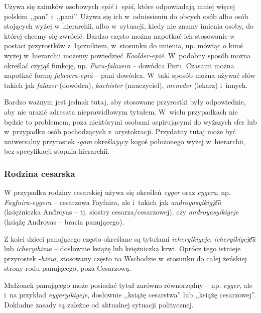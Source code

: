 \begin{spacing}{1.1}
\skipline

Używa się zaimków osobowych \emph{epié} i~\emph{epiá}, które odpowiadają mniej
więcej polskim ,,pan'' i~,,pani''. Używa się ich w~odniesieniu do obcych osób albo
osób stojących wyżej w~hierarchii, albo w~sytuacji, kiedy nie znamy imienia 
osoby, do której chcemy się zwrócić. Bardzo często można napotkać ich stosowanie
w postaci przyrostków z~łącznikiem, w~stosunku do imienia, np. mówiąc o kimś
wyżej w~hierarchii możemy powiedzieć \emph{Koolder-epié}. W~podobny sposób
można określać czyjąś funkcję, np. \emph{Furu-falazera} -- dowódca Furu. Czasami
można napotkać formę \emph{falazera-epiá} -- pani dowódca. W~taki sposób można
używać słów takich jak \emph{falazer} (dowódca), \emph{kachister} (nauczyciel), 
\emph{meneder} (lekarz) i~innych.

Bardzo ważnym jest jednak tutaj, aby stosowane przyrostki były odpowiednie, aby
nie urazić adresata nieprawidłowym tytułem. W~wielu przypadkach nie będzie to
problemem, poza niektórymi osobami aspirującymi do wyższych sfer lub w~przypadku
osób pochodzących z~arystokracji. Przydatny tutaj może być uniwersalny 
przyrostek \emph{-gam} określający kogoś położonego wyżej w~hierarchii, bez
specyfikacji stopnia hierarchii.

\subsubsection{Rodzina cesarska}

W przypadku rodziny cesarskiej używa się określeń \emph{eyger} oraz 
\emph{eygera}, np. \emph{Fayfnira-eygera} -- cesarzowa Fayfnira, ale i~takich jak 
\emph{and́royasyikigje͞a} (księżniczka And́royas -- tj. siostry cesarza/cesarzowej),
czy \emph{and́royasyikigeje} (książę And́royas -- bracia panującego).

Z kolei dzieci panującego często określane są tytułami \emph{icheryikigeje}, 
\emph{icheryikigeje͞a} lub \emph{icheryihima} -- dosłownie książę lub księżniczka 
krwi. Oprócz tego istnieje przyrostek \emph{-hima}, stosowany często na 
Wschodzie w~stosunku do całej żeńskiej strony rodu panującego, poza Cesarzową.

Małżonek panującego może posiadać tytuł zarówno równorzędny -- np. \emph{eyger},
ale i~na przykład \emph{eygeryikigeje}, dosłownie ,,książę cesarstwa'' lub 
,,książę cesarzowej''. Dokładne zasady są zależne od aktualnej sytuacji 
politycznej.


\end{spacing}
